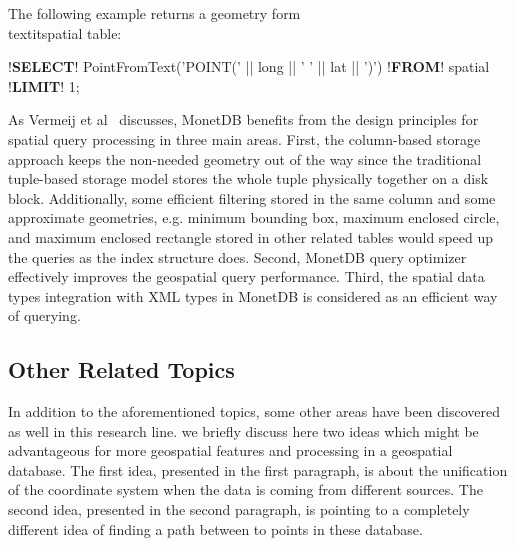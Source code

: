 \documentclass[a4paper,12pt]{article}
\begin{document}
The following example returns a geometry form \\textit{spatial} table:
\vspace{10px}
\begin{fakeJSON}[escapechar=\!]
!\textbf{SELECT}! PointFromText('POINT(' || long || ' ' || lat || ')') !\textbf{FROM}! spatial !\textbf{LIMIT}! 1;
\end{fakeJSON}
\vspace{10px}

As Vermeij et al~\cite{MonetDB} discusses, MonetDB benefits from the design principles for spatial query processing in three main areas. First, the column-based storage approach keeps the non-needed geometry out of the way since the traditional tuple-based storage model stores the whole tuple physically together on a disk block. Additionally, some efficient filtering stored in the same column and some approximate geometries, e.g. minimum bounding box, maximum enclosed circle, and maximum enclosed rectangle stored in other related tables would speed up the queries as the index structure does. Second, MonetDB query optimizer effectively improves the geospatial query performance. Third, the spatial data types integration with XML types in MonetDB is considered as an efficient way of querying. 


\subsection{Other Related Topics}

In addition to the aforementioned topics, some other areas have been discovered as well in this research line. 
we briefly discuss here two ideas which might be advantageous 
for more geospatial features and processing in a geospatial database.
The first idea, presented in the first paragraph, is about the unification of the coordinate system when the data
is coming from different sources. The second idea, presented in the second paragraph, is pointing to a 
completely different idea of finding a path between to points in these database.
\end{document}
